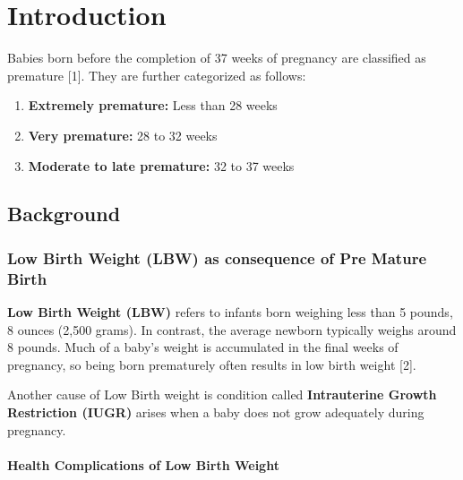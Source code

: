 \documentclass{article}
\begin{document}
\section{Introduction}\label{introduction}

Babies born before the completion of 37 weeks of pregnancy are
classified as premature {[}1{]}. They are further categorized as
follows:

\begin{enumerate}
\def\labelenumi{\arabic{enumi}.}
\item
  \textbf{Extremely premature:} Less than 28 weeks
\item
  \textbf{Very premature:} 28 to 32 weeks
\item
  \textbf{Moderate to late premature:} 32 to 37 weeks
\end{enumerate}

\subsection{Background}\label{background}

\subsubsection{Low Birth Weight (LBW) as consequence of Pre Mature
Birth}\label{low-birth-weight-lbw-as-consequence-of-pre-mature-birth}

\textbf{Low Birth Weight (LBW)} refers to infants born weighing less
than 5 pounds, 8 ounces (2,500 grams). In contrast, the average newborn
typically weighs around 8 pounds. Much of a baby's weight is accumulated
in the final weeks of pregnancy, so being born prematurely often results
in low birth weight {[}2{]}.

Another cause of Low Birth weight is condition called
\textbf{Intrauterine Growth Restriction (IUGR)} arises when a baby does
not grow adequately during pregnancy.

\paragraph{Health Complications of Low Birth
Weight}\label{health-complications-of-low-birth-weight}
\end{document}

